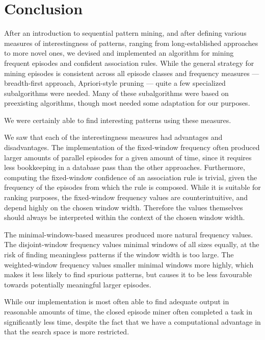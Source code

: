 \chapter{Conclusion}


After an introduction to sequential pattern mining, and after defining various measures of interestingness of patterns, ranging from long-established approaches to more novel ones, we devised and implemented an algorithm for mining frequent episodes and confident association rules. While the general strategy for mining episodes is consistent across all episode classes and frequency measures --- breadth-first approach, Apriori-style pruning --- quite a few specialized subalgorithms were needed. Many of these subalgorithms were based on preexisting algorithms, though most needed some adaptation for our purposes.


We were certainly able to find interesting patterns using these measures.

We saw that each of the interestingness measures had advantages and disadvantages. The implementation of the fixed-window frequency often produced larger amounts of parallel episodes for a given amount of time, since it requires less bookkeeping in a database pass than the other approaches. Furthermore, computing the fixed-window confidence of an association rule is trivial, given the frequency of the episodes from which the rule is composed. While it is suitable for ranking purposes, the fixed-window frequency values are counterintuitive, and depend highly on the chosen window width. Therefore the values themselves should always be interpreted within the context of the chosen window width.

The minimal-windows-based measures produced more natural frequency values. The disjoint-window frequency values minimal windows of all sizes equally, at the risk of finding meaningless patterns if the window width is too large. The weighted-window frequency values smaller minimal windows more highly, which makes it less likely to find spurious patterns, but causes it to be less favourable towards potentially meaningful larger episodes.

While our implementation is most often able to find adequate output in reasonable amounts of time, the closed episode miner often completed a task in significantly less time, despite the fact that we have a computational advantage in that the search space is more restricted.

